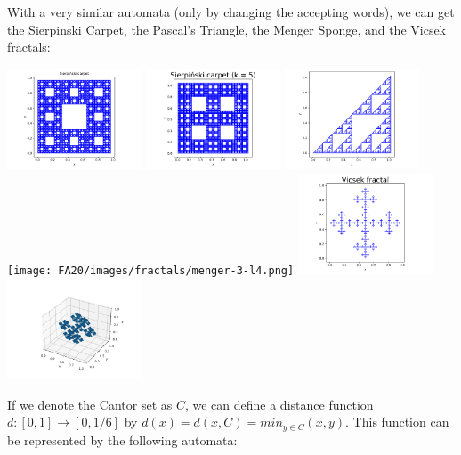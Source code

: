 \documentclass[10pt,usenames,dvipsnames]{article}
\begin{document}
With a very similar automata (only by changing the accepting words), we can get the Sierpinski Carpet, the Pascal's Triangle, the Menger Sponge, and the Vicsek fractals:

\begin{center}
    \includegraphics[width=4cm]{FA20/images/fractals/sierpinski-3-l5.pdf}
    \includegraphics[width=4cm]{FA20/images/fractals/sierpinski-5-l3.pdf}
    \includegraphics[width=4cm]{FA20/images/fractals/pascal2.pdf}\\
    \texttt{[image: FA20/images/fractals/menger-3-l4.png]}
    \includegraphics[width=4cm]{FA20/images/fractals/vicsek-l5.pdf}
    \includegraphics[width=4cm]{FA20/images/fractals/vicsek-3d-l4.png}
\end{center}

If we denote the Cantor set as $C$, we can define a distance function $d:[0,1]\rightarrow [0,1/6]$ by $d(x) = d(x,C) = min_{y \in C}(x,y)$. This function can be represented by the following automata: 
\end{document}
